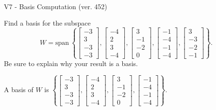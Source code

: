 \begin{exercise}
  \begin{exerciseTitle}V7 - Basis Computation (ver. 452)\end{exerciseTitle}
  \begin{exerciseStatement}
    Find a basis for the subspace 
\[W=\mathrm{span}\ \left\{\left[\begin{array}{r}
-3 \\
3 \\
-3 \\
-3
\end{array}\right] , \left[\begin{array}{r}
-4 \\
2 \\
3 \\
-4
\end{array}\right] , \left[\begin{array}{r}
3 \\
-1 \\
-2 \\
0
\end{array}\right] , \left[\begin{array}{r}
-1 \\
-4 \\
-1 \\
-4
\end{array}\right] , \left[\begin{array}{r}
3 \\
-3 \\
-2 \\
-1
\end{array}\right]\right\}.\]
 Be sure to explain why your result is a basis.


  \end{exerciseStatement}
  \begin{exerciseAnswer}
   A basis of \(W\) is  \(\left\{\left[\begin{array}{r}
-3 \\
3 \\
-3 \\
-3
\end{array}\right] , \left[\begin{array}{r}
-4 \\
2 \\
3 \\
-4
\end{array}\right] , \left[\begin{array}{r}
3 \\
-1 \\
-2 \\
0
\end{array}\right] , \left[\begin{array}{r}
-1 \\
-4 \\
-1 \\
-4
\end{array}\right]\right\}\).
  


  \end{exerciseAnswer}
\end{exercise}